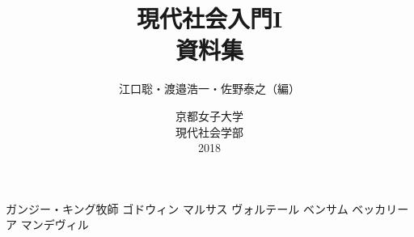 \documentclass[autodetect-engine,dvipdfmx-if-dvi,ja=standard,dvipdfmx,openany,twocolumn]{bxjsreport}
\author{江口聡・渡邉浩一・佐野泰之（編）}
\date{京都女子大学\\現代社会学部\\2018}
\title{現代社会入門I\\資料集}
\begin{document}

\maketitle
\tableofcontents
% 



% 

% 
% 




% 




% 


ガンジー・キング牧師
ゴドウィン
マルサス
ヴォルテール
ベンサム
ベッカリーア
マンデヴィル

\fi %





%   
% 
\end{document}
